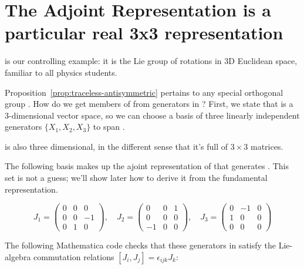 \section{The Adjoint Representation is a particular real 3x3 representation}

 is our controlling example: it is the Lie group of rotations in 3D
Euclidean space, familiar to all physics students. 

Proposition~\ref{prop:traceless-antisymmetric} pertains to any special
orthogonal group . How do we get members of  from generators in
? First, we state that  is a
3\nobreakdash-dimensional vector space, so we can choose a basis of three
linearly independent generators $\{X_1, X_2, X_3\}$ to span . 

 is also three dimensional, in the different sense that it's full of
$3\times{}3$ matrices. 

The following basis makes up the ajoint representation of  that generates
. This set is not a guess; we'll show later how to derive it from the
fundamental representation.

{
\small
\addtolength{\arraycolsep}{-3pt}
\begin{equation}
    J_1 = 
    \begin{pmatrix}
        0 & 0 & 0 \\
        0 & 0 & -1 \\
        0 & 1 & 0
    \end{pmatrix}, \quad
    J_2 = 
    \begin{pmatrix}
        0 & 0 & 1 \\
        0 & 0 & 0 \\
        -1 & 0 & 0
    \end{pmatrix}, \quad
    J_3 = 
    \begin{pmatrix}
        0 & -1 & 0 \\
        1 & 0 & 0 \\
        0 & 0 & 0
    \end{pmatrix}
    \tag{Sch:3.61}
\end{equation}
}

The following Mathematica code checks that these generators in  satisfy
the Lie-algebra commutation relations $[J_i, J_j] = \epsilon_{ijk}
J_k$:

